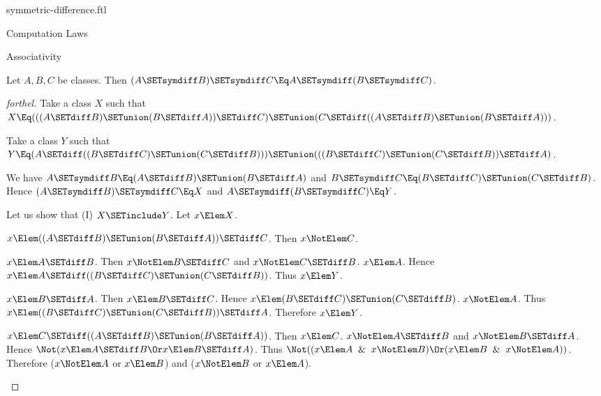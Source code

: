 \documentclass{stex}
\begin{document}
\begin{smodule}{symmetric-difference.ftl}
\begin{sfragment}{Computation Laws}
  \begin{sfragment}{Associativity}
    \begin{proposition}[forthel]
      Let $A, B, C$ be classes.
      Then $(A \SETsymdiff B) \SETsymdiff C \Eq A \SETsymdiff (B \SETsymdiff C)$.
    \end{proposition}
    \begin{proof}[forthel]
      Take a class $X$ such that $X \Eq (((A \SETdiff B) \SETunion (B \SETdiff A)) \SETdiff C) \SETunion (C \SETdiff ((A \SETdiff B) \SETunion (B \SETdiff A)))$.

      Take a class $Y$ such that $Y \Eq (A \SETdiff ((B \SETdiff C) \SETunion (C \SETdiff B))) \SETunion (((B \SETdiff C) \SETunion (C \SETdiff B)) \SETdiff A)$.

      We have $A \SETsymdiff B \Eq (A \SETdiff B) \SETunion (B \SETdiff A)$ and $B \SETsymdiff C \Eq (B \SETdiff C) \SETunion (C \SETdiff B)$.
      Hence $(A \SETsymdiff B) \SETsymdiff C \Eq X$ and $A \SETsymdiff (B \SETsymdiff C) \Eq Y$.

      Let us show that (I) $X \SETinclude Y$.
        Let $x \Elem X$.

        \begin{case}{$x \Elem ((A \SETdiff B) \SETunion (B \SETdiff A)) \SETdiff C$.}
          Then $x \NotElem C$.

          \begin{case}{$x \Elem A \SETdiff B$.}
            Then $x \NotElem B \SETdiff C$ and $x \NotElem C \SETdiff B$. $x \Elem A$.
            Hence $x \Elem A \SETdiff ((B \SETdiff C) \SETunion (C \SETdiff B))$.
            Thus $x \Elem Y$.
          \end{case}

          \begin{case}{$x \Elem B \SETdiff A$.}
            Then $x \Elem B \SETdiff C$.
            Hence $x \Elem (B \SETdiff C) \SETunion (C \SETdiff B)$. $x \NotElem A$.
            Thus $x \Elem ((B \SETdiff C) \SETunion (C \SETdiff B)) \SETdiff A$.
            Therefore $x \Elem Y$.
          \end{case}
        \end{case}

        \begin{case}{$x \Elem C \SETdiff ((A \SETdiff B) \SETunion (B \SETdiff A))$.}
          Then $x \Elem C$.
          $x \NotElem A \SETdiff B$ and $x \NotElem B \SETdiff A$.
          Hence $\Not(x \Elem A \SETdiff B \Or x \Elem B \SETdiff A)$.
          Thus  $\Not((x \Elem A \And x \NotElem B) \Or (x \Elem B \And x \NotElem A))$.
          Therefore ($x \NotElem A$ or $x \Elem B$) and ($x \NotElem B$ or $x \Elem A$).


\end{case}
\end{proof}
\end{sfragment}
\end{sfragment}
\end{smodule}
\end{document}
